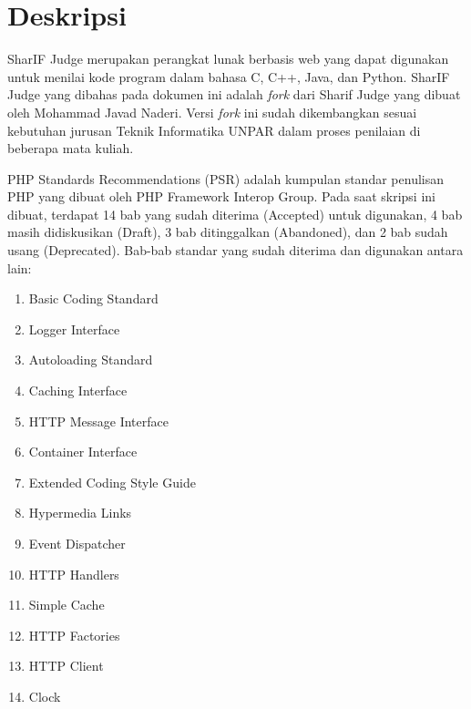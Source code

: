 \documentclass[a4paper,twoside]{article}
\begin{document}
\title{\@judultopik}
\author{\nama \textendash \@npm} 

\newcommand{\nama}{Nicholas Khrisna Sandyawan}
\newcommand{\@npm}{6181801060}
\newcommand{\@judultopik}{Evaluasi PHP Standards Recommendations pada proyek SharIF Judge} %
\newcommand{\jumpemb}{1} %
\newcommand{\tanggal}{24/03/2023}


\maketitle


\section{Deskripsi}
SharIF Judge merupakan perangkat lunak berbasis web yang dapat digunakan untuk menilai kode program dalam bahasa C, C++, Java, dan Python. SharIF Judge yang dibahas pada dokumen ini adalah \textit{fork} dari Sharif Judge yang dibuat oleh Mohammad Javad Naderi. Versi \textit{fork} ini sudah dikembangkan sesuai kebutuhan jurusan Teknik Informatika UNPAR dalam proses penilaian di beberapa mata kuliah.

PHP Standards Recommendations (PSR) adalah kumpulan standar penulisan PHP yang dibuat oleh PHP Framework Interop Group. Pada saat skripsi ini dibuat, terdapat 14 bab yang sudah diterima (Accepted) untuk digunakan, 4 bab masih didiskusikan (Draft), 3 bab ditinggalkan (Abandoned), dan 2 bab sudah usang (Deprecated). Bab-bab standar yang sudah diterima dan digunakan antara lain: 
\begin {enumerate}
\item Basic Coding Standard
\item Logger Interface
\item Autoloading Standard
\item Caching Interface
\item HTTP Message Interface
\item Container Interface
\item Extended Coding Style Guide
\item Hypermedia Links
\item Event Dispatcher
\item HTTP Handlers
\item Simple Cache
\item HTTP Factories
\item HTTP Client
\item Clock
\end {enumerate}	
\end{document}
